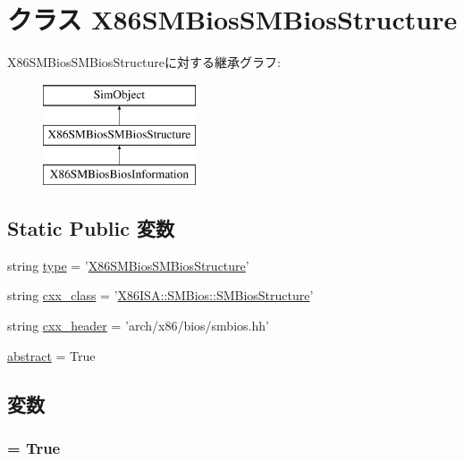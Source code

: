 \hypertarget{classSMBios_1_1X86SMBiosSMBiosStructure}{
\section{クラス X86SMBiosSMBiosStructure}
\label{classSMBios_1_1X86SMBiosSMBiosStructure}
}
X86SMBiosSMBiosStructureに対する継承グラフ:\begin{figure}[H]
\begin{center}
\leavevmode
\includegraphics[height=3cm]{classSMBios_1_1X86SMBiosSMBiosStructure}
\end{center}
\end{figure}
\subsection*{Static Public 変数}
\begin{DoxyCompactItemize}
\item 
string \hyperlink{classSMBios_1_1X86SMBiosSMBiosStructure_acce15679d830831b0bbe8ebc2a60b2ca}{type} = '\hyperlink{classSMBios_1_1X86SMBiosSMBiosStructure}{X86SMBiosSMBiosStructure}'
\item 
string \hyperlink{classSMBios_1_1X86SMBiosSMBiosStructure_a58cd55cd4023648e138237cfc0822ae3}{cxx\_\-class} = '\hyperlink{classX86ISA_1_1SMBios_1_1SMBiosStructure}{X86ISA::SMBios::SMBiosStructure}'
\item 
string \hyperlink{classSMBios_1_1X86SMBiosSMBiosStructure_a17da7064bc5c518791f0c891eff05fda}{cxx\_\-header} = 'arch/x86/bios/smbios.hh'
\item 
\hyperlink{classSMBios_1_1X86SMBiosSMBiosStructure_a17fa61ac3806b481cafee5593b55e5d0}{abstract} = True
\end{DoxyCompactItemize}


\subsection{変数}
\hypertarget{classSMBios_1_1X86SMBiosSMBiosStructure_a17fa61ac3806b481cafee5593b55e5d0}{
\subsubsection[{abstract}]{ = True}}
\label{classSMBios_1_1X86SMBiosSMBiosStructure_a17fa61ac3806b481cafee5593b55e5d0}


